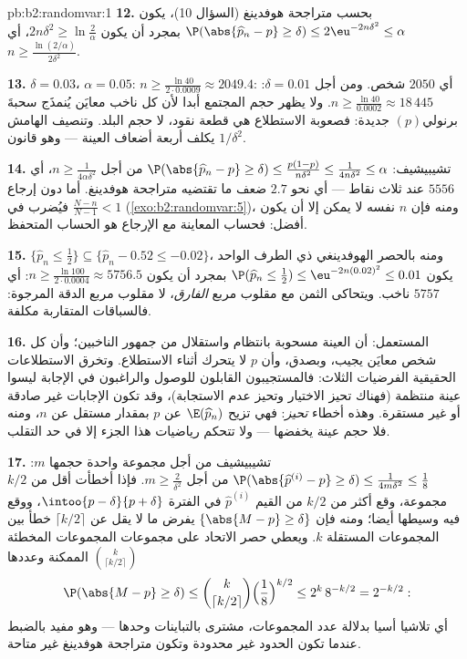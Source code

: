 \begin{solution}{pb:b2:randomvar:1}
\textbf{12.} بحسب متراجحة هوفدينغ (السؤال 10)، يكون $\P(\abs{\widehat
p_n - p} \geq \delta) \leq 2\eu^{-2n\delta^2} \leq \alpha$ بمجرد أن
يكون $2n\delta^2 \geq \ln\frac2\alpha$، أي $n \geq
\frac{\ln(2/\alpha)}{2\delta^2}$.

\textbf{13.} $\delta = 0.03$، $\alpha = 0.05$: $n \geq
\frac{\ln 40}{2\cdot0.0009} \approx 2049.4$: أي $2050$ شخص. ومن أجل
$\delta = 0.01$: $n \geq \frac{\ln40}{0.0002} \approx
18\,445$. ولا يظهر حجم المجتمع أبدا لأن كل ناخب معايَن يُنمذَج
سحبةَ برنولي$(p)$ جديدة: فصعوبة الاستطلاع هي  قطعة نقود، لا
حجم البلد. وتنصيف الهامش يكلف أربعة أضعاف العينة --- وهو قانون
$1/\delta^2$.

\textbf{14.} تشيبيشيف: $\P(\abs{\widehat p_n - p} \geq
\delta) \leq \frac{p(1-p)}{n\delta^2} \leq
\frac1{4n\delta^2} \leq \alpha$ من أجل $n \geq
\frac1{4\alpha\delta^2}$، أي $5556$ عند ثلاث
نقاط --- أي نحو $2.7$ ضعف ما تقتضيه متراجحة هوفدينغ. أما دون إرجاع
فيُضرب  في $\frac{N -
n}{N-1} < 1$ (\cref{exo:b2:randomvar:5})، ومنه فإن $n$ نفسه لا يمكن
إلا أن يكون أفضل: فحساب المعاينة مع الإرجاع هو الحساب المتحفظ.

\textbf{15.} $\{\widehat p_n \leq \frac12\} \subseteq
\{\widehat p_n - 0.52 \leq -0.02\}$، ومنه بالحصر الهوفدينغي ذي الطرف الواحد يكون
$\P(\widehat p_n \leq \tfrac12) \leq
\eu^{-2n(0.02)^2} \leq 0.01$ بمجرد أن يكون $n \geq \frac{\ln
100}{2\cdot0.0004} \approx 5756.5$: أي $5757$ ناخب. ويتحاكى الثمن مع
مقلوب مربع \emph{الفارق}، لا مقلوب مربع الدقة المرجوة: فالسباقات
المتقاربة مكلفة.

\textbf{16.} المستعمل: أن العينة مسحوبة بانتظام واستقلال من جمهور
الناخبين؛ وأن كل شخص معايَن يجيب، وبصدق، وأن $p$ لا يتحرك أثناء
الاستطلاع. وتخرق الاستطلاعات الحقيقية الفرضيات الثلاث: فالمستجيبون
القابلون للوصول والراغبون في الإجابة ليسوا عينة منتظمة (فهناك تحيز
الاختيار وتحيز عدم الاستجابة)، وقد تكون الإجابات غير صادقة أو غير
مستقرة. وهذه أخطاء \emph{تحيز}: فهي تزيح $\E(\widehat p_n)$ عن $p$ بمقدار
مستقل عن $n$، ومنه فلا حجم عينة يخفضها --- ولا تتحكم رياضيات
هذا الجزء إلا في حد التقلب.

\textbf{17.} تشيبيشيف من أجل مجموعة واحدة حجمها $m$: $\P(\abs{
\widehat p^{(i)} - p} \geq \delta) \leq \frac{1}{4m\delta^2}
\leq \frac18$ من
أجل $m \geq \frac2{\delta^2}$. فإذا أخطأت أقل من $k/2$ مجموعة، وقع أكثر من $k/2$
من القيم $\widehat p^{(i)}$ في الفترة  $\intoo{p -
\delta}{p + \delta}$، ووقع فيه وسيطها أيضا؛
ومنه فإن $\{\abs{M - p} \geq \delta\}$ يفرض ما لا يقل عن $\lceil
k/2\rceil$ خطأ بين المجموعات المستقلة
$k$. ويعطي حصر الاتحاد على مجموعات المجموعات المخطئة الممكنة
وعددها $\binom k{\lceil k/2\rceil}$
\[
\P(\abs{M - p} \geq \delta)
\leq \binom{k}{\lceil k/2\rceil}
\Bigl(\frac18\Bigr)^{k/2}
\leq 2^k\,8^{-k/2} = 2^{-k/2} :
\]
أي تلاشيا أسيا بدلالة عدد المجموعات، مشترى بالتباينات وحدها ---
وهو مفيد بالضبط عندما تكون الحدود غير محدودة وتكون متراجحة هوفدينغ
غير متاحة.


\end{solution}
